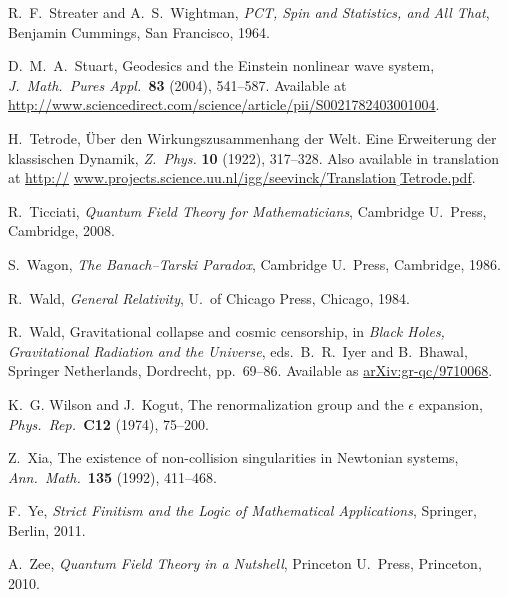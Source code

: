 \documentclass[12pt]{article}
\begin{document}
\begin{thebibliography}{10}
 R.\ F.\ Streater and A.\ S.\ Wightman, \textsl{PCT, Spin and Statistics, and All That}, Benjamin Cummings, San Francisco, 1964.

 D.\ M.\ A.\ Stuart, Geodesics and the Einstein nonlinear wave system, 
\textsl{J.\ Math.\ Pures Appl.\ }\textbf{83} (2004), 541--587.  Available at \href{http://www.sciencedirect.com/science/article/pii/S0021782403001004}{http://www.sciencedirect.com/science/article/pii/S0021782403001004}.

 H.\ Tetrode, \"Uber den Wirkungszusammenhang der Welt. Eine Erweiterung der klassischen Dynamik, \textsl{Z.\ Phys.} \textbf{10} (1922), 317--328.  Also available in translation at  \href{http://www.projects.science.uu.nl/igg/seevinck/Translation_Tetrode.pdf}{http://}
 \href{http://www.projects.science.uu.nl/igg/seevinck/Translation_Tetrode.pdf} {www.projects.science.uu.nl/igg/seevinck/Translation$\underline{\;}$Tetrode.pdf}.

 R.\ Ticciati, \textsl{Quantum Field Theory for Mathematicians},
Cambridge U.\ Press, Cambridge, 2008.

 S.\ Wagon, {\sl The Banach--Tarski Paradox}, Cambridge
U.\ Press, Cambridge, 1986.

 R.\ Wald, \textsl{General Relativity}, U.\ of Chicago Press, Chicago, 
1984.

 R.\ Wald, Gravitational collapse and cosmic censorship, in \textsl{Black Holes, Gravitational Radiation and the Universe}, eds.\ 
B.\ R.\ Iyer and B.\ Bhawal, Springer Netherlands, Dordrecht, pp.\ 69--86.
Available as \href{http://arxiv.org/abs/gr-qc/9710068}{arXiv:gr-qc/9710068}.

 K.\ G. Wilson and J.\ Kogut, The renormalization group and the $\epsilon$ expansion, \textsl{Phys.\ Rep.\ }\textbf{C12} (1974), 75--200. 

 Z.\ Xia, The existence of non-collision singularities in Newtonian systems, \textsl{Ann.\ Math.\ }{\bf 135} (1992), 411--468. 

  F.\ Ye, \textsl{Strict Finitism and the Logic of Mathematical Applications}, Springer,
Berlin, 2011.

 A.\ Zee, \textsl{Quantum Field Theory in a Nutshell}, Princeton U.\ 
Press, Princeton, 2010.

\end{thebibliography}
\end{document}

